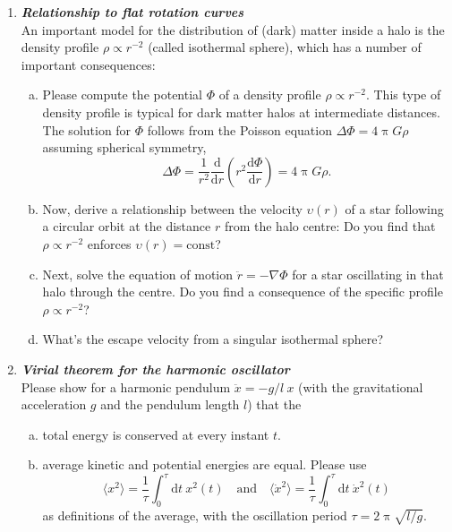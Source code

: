 \documentclass[a4paper,12pt]{article}
\newcommand{\question}[1]{\textbf{\textit{#1}}}
\newcommand{\dd}{\mathrm{d}}
\renewcommand{\pi}{\uppi}
\newcommand{\bra}{\langle}
\newcommand{\ket}{\rangle}
\begin{document}
\begin{enumerate}
\item \question{Relationship to flat rotation curves}\\
An important model for the distribution of (dark) matter inside a halo is the density profile $\rho\propto r^{-2}$ (called isothermal sphere), which has a number of important consequences:
\begin{enumerate}[(a)]
\item{Please compute the potential $\Phi$ of a density profile $\rho\propto r^{-2}$. This type of density profile is typical for dark matter halos at intermediate distances. The solution for $\Phi$ follows from the Poisson equation $\Delta\Phi = 4\pi G\rho$ assuming spherical symmetry,
\begin{equation}
\Delta\Phi = \frac{1}{r^2}\frac{\dd}{\dd r}\left(r^2\frac{\dd\Phi}{\dd r}\right) = 4\pi G\rho.
\end{equation}
}
\item{Now, derive a relationship between the velocity $\upsilon(r)$ of a star following a circular orbit at the distance $r$ from the halo centre: Do you find that $\rho\propto r^{-2}$ enforces $\upsilon(r) = \mathrm{const}$?}
\item{Next, solve the equation of motion $\ddot{r} = -\nabla\Phi$ for a star oscillating in that halo through the centre. Do you find a consequence of the specific profile $\rho\propto r^{-2}$?}
\item{What's the escape velocity from a singular isothermal sphere?}
\end{enumerate}


\item \question{Virial theorem for the harmonic oscillator}\\
Please show for a harmonic pendulum $\ddot{x} = -g/l\:x$ (with the gravitational acceleration $g$ and the pendulum length $l$) that the
\begin{enumerate}[(a)]
\item total energy is conserved at every instant $t$.
\item average kinetic and potential energies are equal. Please use
\begin{equation}
\bra x^2\ket = \frac{1}{\tau}\int_0^\tau\dd t\:x^2(t)
\quad\mathrm{and}\quad
\bra \dot{x}^2\ket = \frac{1}{\tau}\int_0^\tau\dd t\:\dot{x}^2(t)
\end{equation}
as definitions of the average, with the oscillation period $\tau = 2\pi\sqrt{l/g}$.
\end{enumerate}



\end{enumerate}
\end{document}
